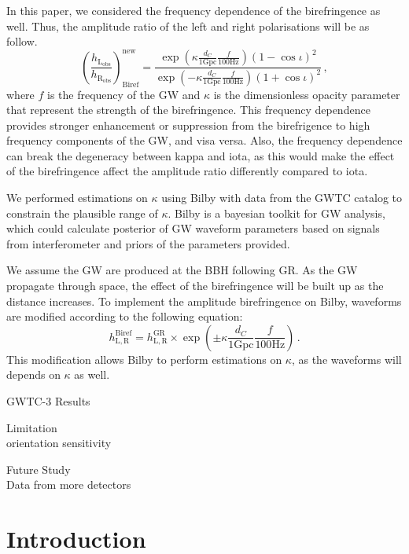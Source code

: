 \documentclass[twocolumn]{aastex631}
\begin{document}
In this paper, we considered the frequency dependence of the birefringence as well. Thus, the amplitude ratio of the left and right polarisations will be as follow.
\begin{equation}
    \left(\frac{h_\mathrm{L_{obs}}}{h_\mathrm{R_{obs}}}\right)_\mathrm{Biref}^\mathrm{new}=\frac{\exp\left({\kappa\frac{d_C}{1\mathrm{ Gpc}}\frac{f}{100\mathrm{ Hz}}}\right)\left(1-\cos\iota\right)^2}{\exp\left({-\kappa\frac{d_C}{1\mathrm{Gpc}}\frac{f}{100\mathrm{Hz}}}\right)\left(1+\cos\iota\right)^2}\,,
\end{equation}where $f$ is the frequency of the GW and $\kappa$ is the dimensionless opacity parameter that represent the strength of the birefringence.
This frequency dependence provides stronger enhancement or suppression from the birefrigence to high frequency components of the GW, and visa versa.
Also, the frequency dependence can break the degeneracy between kappa and iota, as this would make the effect of the birefringence affect the amplitude ratio differently compared to iota.

We performed estimations on $\kappa$ using Bilby with data from the GWTC catalog to constrain the plausible range of $\kappa$.
Bilby is a bayesian toolkit for GW analysis, which could calculate posterior of GW waveform parameters based on signals from interferometer and priors of the parameters provided. \citep{Ashton_2019}

We assume the GW are produced at the BBH following GR. As the GW propagate through space, the effect of the birefringence will be built up as the distance increases.
To implement the amplitude birefringence on Bilby, waveforms are modified according to the following equation:
\begin{equation}
    h_\mathrm{L,R}^{\mathrm{Biref}}=
    h_\mathrm{L,R}^{\mathrm{GR}}\times
    \exp\left(\pm\kappa\frac{d_C}{1\mathrm{ Gpc}}\frac{f}{100\mathrm{ Hz}}\right)\,.
\end{equation}
This modification allows Bilby to perform estimations on $\kappa$, as the waveforms will depends on $\kappa$ as well.

GWTC-3 Results

Limitation\\
orientation
sensitivity

Future Study\\
Data from more detectors

\section{Introduction}
\end{document}

